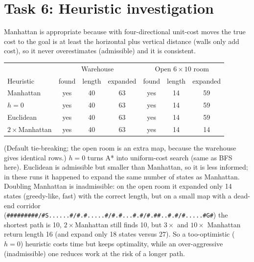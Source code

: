 \documentclass[10pt,a4paper]{article}
\begin{document}
\section*{Task 6: Heuristic investigation}
Manhattan is appropriate because with four-directional unit-cost moves the true cost to the goal is at least the horizontal plus vertical distance (walls only add cost), so it never overestimates (admissible) and it is consistent.
\begin{center}\begin{tabular}{lccc|ccc}\toprule
 & \multicolumn{3}{c|}{Warehouse} & \multicolumn{3}{c}{Open $6\times10$ room}\\
Heuristic & found & length & expanded & found & length & expanded\\\midrule
Manhattan & yes & 40 & 63 & yes & 14 & 59\\
$h=0$ & yes & 40 & 63 & yes & 14 & 59\\
Euclidean & yes & 40 & 63 & yes & 14 & 59\\
$2\times$Manhattan & yes & 40 & 63 & yes & 14 & 14\\\bottomrule\end{tabular}\end{center}
(Default tie-breaking; the open room is an extra map, because the warehouse gives identical rows.) $h=0$ turns A* into uniform-cost search (same as BFS here). Euclidean is admissible but smaller than Manhattan, so it is less informed; in these runs it happened to expand the same number of states as Manhattan. Doubling Manhattan is inadmissible: on the open room it expanded only 14 states (greedy-like, fast) with the correct length, but on a small map with a dead-end corridor (\texttt{\#\#\#\#\#\#\#\#\#/\#S......\#/\#.\#.....\#/\#.\#...\#.\#/\#.\#\#..\#.\#/\#.....\#G\#}) the shortest path is 10, $2\times$Manhattan still finds 10, but $3\times$ and $10\times$ Manhattan return length 16 (and expand only 18 states versus 27). So a too-optimistic ($h=0$) heuristic costs time but keeps optimality, while an over-aggressive (inadmissible) one reduces work at the risk of a longer path.
\end{document}
